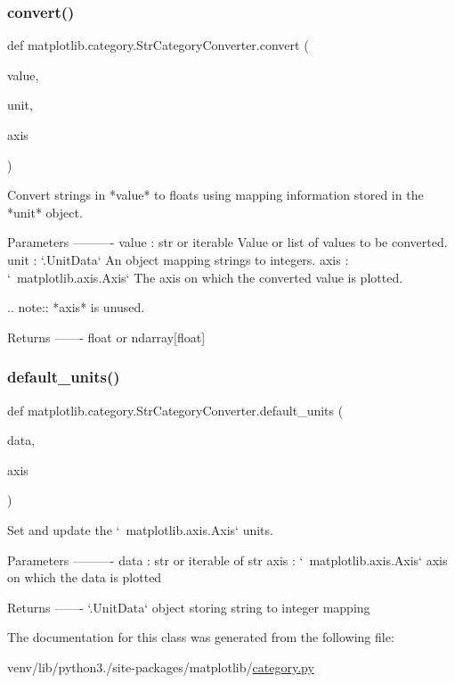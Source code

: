\subsubsection{\texorpdfstring{convert()}{convert()}}
{\footnotesize\ttfamily def matplotlib.\+category.\+Str\+Category\+Converter.\+convert (\begin{DoxyParamCaption}\item[{}]{value,  }\item[{}]{unit,  }\item[{}]{axis }\end{DoxyParamCaption})\hspace{0.3cm}{\ttfamily [static]}}

\begin{DoxyVerb}Convert strings in *value* to floats using mapping information stored
in the *unit* object.

Parameters
----------
value : str or iterable
    Value or list of values to be converted.
unit : `.UnitData`
    An object mapping strings to integers.
axis : `~matplotlib.axis.Axis`
    The axis on which the converted value is plotted.

    .. note:: *axis* is unused.

Returns
-------
float or ndarray[float]
\end{DoxyVerb}
 \mbox{\label{classmatplotlib_1_1category_1_1StrCategoryConverter_a25039041c51db034d0fa4b607b8e00d9}} 
\subsubsection{\texorpdfstring{default\+\_\+units()}{default\_units()}}
{\footnotesize\ttfamily def matplotlib.\+category.\+Str\+Category\+Converter.\+default\+\_\+units (\begin{DoxyParamCaption}\item[{}]{data,  }\item[{}]{axis }\end{DoxyParamCaption})\hspace{0.3cm}{\ttfamily [static]}}

\begin{DoxyVerb}Set and update the `~matplotlib.axis.Axis` units.

Parameters
----------
data : str or iterable of str
axis : `~matplotlib.axis.Axis`
    axis on which the data is plotted

Returns
-------
`.UnitData`
    object storing string to integer mapping
\end{DoxyVerb}
 

The documentation for this class was generated from the following file\+:\begin{DoxyCompactItemize}
\item 
venv/lib/python3./site-\/packages/matplotlib/\hyperlink{category_8py}{category.\+py}\end{DoxyCompactItemize}

